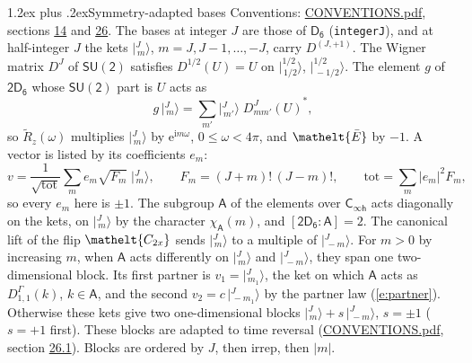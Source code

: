 \documentclass[10pt,a4paper]{article}
\makeatletter
\renewcommand\section{\@startsection{section}{1}{\z@}{-3ex plus -1ex minus -.2ex}%
  {1.2ex plus .2ex}{\normalfont\large\sffamily\bfseries\color{parttitle}}}
\numberwithin{equation}{section}
\newcommand{\eltfont}[1]{{\let\sigma\eltsigma\mathelt{#1}}}
\newcommand{\grp}[1]{\mathsf{#1}}
\newcommand{\elt}[1]{\eltfont{#1}}
\newcommand{\grpindex}[2]{[#1 : #2]}
\newcommand{\iunit}{\mathrm{i}}
\newcommand{\expe}{\mathrm{e}}
\newcommand{\irrJp}[2]{D^{(#1,#2)}}
\newcommand{\repD}[1]{D^{#1}}
\newcommand{\wignerD}[1]{D^{#1}}
\newcommand{\chiA}{\chi_{\grp{A}}}
\newcommand{\conj}[1]{{#1}^{*}}
\newcommand{\jm}[2]{\bigl\lvert{}^{#1}_{\,#2}\bigr\rangle}
\newcommand{\barred}[1]{\bar{#1}}
\newcommand{\lift}[1]{\tilde{#1}}
\makeatother
\begin{document}
\section{Symmetry-adapted bases}\label{s:bases}
Conventions: \href{../../CONVENTIONS.pdf}{CONVENTIONS.pdf}, sections \href{../../../rotation/CONVENTIONS.pdf\#conv.14}{14} and \href{../../CONVENTIONS.pdf\#conv.26}{26}.
\leavevmode\label{n:index.m}\label{n:vector.ket}The bases at integer $J$ are those of \href{../../../rotation/data/pdf/D6.pdf}{$\grp{D_{6}}$} (\texttt{integerJ}), and at half-integer $J$ the kets $\jm{J}{m}$, $m = J, J-1, \dots, -J$, carry $\irrJp{J}{+1}$. \label{n:matrix.wigner}The Wigner matrix $\wignerD{J}$ of $\grp{SU(2)}$ satisfies $\wignerD{1/2}(U) = U$ on $\jm{1/2}{1/2}$, $\jm{1/2}{-1/2}$. The element $g$ of $\grp{2D_{6}}$ whose $\grp{SU(2)}$ part is $U$ acts as
\begin{equation}\label{e:action}g\,\jm{J}{m} = \sum_{m'} \jm{J}{m'}\; \conj{\wignerD{J}_{m m'}(U)},\end{equation}
so $\lift{R}_{z}(\omega)$ multiplies $\jm{J}{m}$ by $\expe^{\iunit m\omega}$, $0 \le \omega < 4\pi$, and $\elt{\barred{E}}$ by $-1$. \label{n:index.ketcoefficient}\label{n:vector.basis.symmetry}\label{n:index.ketweight}\label{n:index.total}A vector is listed by its coefficients $e_m$:
\begin{equation}\label{e:ket}v = \frac{1}{\sqrt{\mathrm{tot}}}\sum_m e_m\sqrt{F_m}\;\jm{J}{m},\qquad F_m = (J+m)!\,(J-m)!,\qquad \mathrm{tot} = \sum_m |e_m|^2F_m,\end{equation}
so every $e_m$ here is $\pm 1$.
\leavevmode\label{n:group.A}\label{n:function.character.abelian}The subgroup $\grp{A}$ of the elements over $\grp{C_{\infty h}}$ acts diagonally on the kets, on $\jm{J}{m}$ by the character $\chiA(m)$, and $\grpindex{\grp{2D_{6}}}{\grp{A}} = 2$. The canonical lift of the flip $\elt{C_{2x}}$ sends $\jm{J}{m}$ to a multiple of $\jm{J}{-m}$. For $m > 0$ by increasing $m$, when $\grp{A}$ acts differently on $\jm{J}{m}$ and $\jm{J}{-m}$, they span one two-dimensional block. \label{n:index.partner.sign}Its first partner is $v_1 = \jm{J}{m_1}$, the ket on which $\grp{A}$ acts as $\repD{\Gamma}_{1,1}(k)$, $k \in \grp{A}$, and the second $v_2 = c\,\jm{J}{-m_1}$ by the partner law (\ref{e:partner}). \label{n:index.pair.sign}Otherwise these kets give two one-dimensional blocks $\jm{J}{m} + s\,\jm{J}{-m}$, $s = \pm 1$ ($s = +1$ first). These blocks are adapted to time reversal (\href{../../CONVENTIONS.pdf}{CONVENTIONS.pdf}, section \href{../../CONVENTIONS.pdf\#conv.26.1}{26.1}). Blocks are ordered by $J$, then irrep, then $|m|$.
\end{document}
